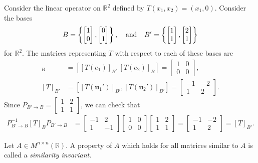 \documentclass[12pt,letterpaper,reqno]{article}
\numberwithin{equation}{section}
\newcommand{\R}{\ensuremath{\mathbb R}}
\newcommand{\bu}{\mathbf{u}}
\begin{document}
\begin{example}
Consider the linear operator on $\R^2$ defined by $T(x_1,x_2)=(x_1,0)$. Consider the bases
\begin{align*}
	B=\left\{\begin{bmatrix}
		1 \\ 0
	\end{bmatrix}, \begin{bmatrix}
		0 \\ 1
	\end{bmatrix}\right\}, \hspace{0.25cm} \text{ and } \hspace{0.25cm} B'=\left\{\begin{bmatrix}
		1 \\ 1
	\end{bmatrix}, \begin{bmatrix}
		2 \\ 1
	\end{bmatrix}\right\}
\end{align*}
for $\R^2$. The matrices representing $T$ with respect to each of these bases are 
\begin{align*}
	[T]_{B}&=[[T(e_1)]_B,[T(e_2)]_B]=\begin{bmatrix}
		1 & 0 \\
		0 & 0
	\end{bmatrix}, \\
	[T]_{B'}&=[[T(\bu_1')]_{B'},[T(\bu_2')]_{B'}]=\begin{bmatrix}
		-1 & -2 \\
		1 & 2
	\end{bmatrix}.
\end{align*}
Since $P_{B' \to B}=\begin{bmatrix}
	1 & 2 \\
	1 & 1
\end{bmatrix}$, we can check that
\begin{align*}
	P_{B' \to B}^{-1}[T]_BP_{B' \to B}&=\begin{bmatrix}
		-1 & 2 \\
		1 & -1
	\end{bmatrix}\begin{bmatrix}
		1 & 0 \\
		0 & 0
	\end{bmatrix}\begin{bmatrix}
		1 & 2 \\ 1 & 1 
	\end{bmatrix}=\begin{bmatrix}
		-1 & -2 \\
		1 & 2
	\end{bmatrix}=[T]_{B'}.
\end{align*}
\end{example}
\begin{defn}
	Let $A \in M^{n \times n}(\R)$. A property of $A$ which holds for all matrices similar to $A$ is called a \emph{similarity invariant}.
\end{defn}
\end{document}
